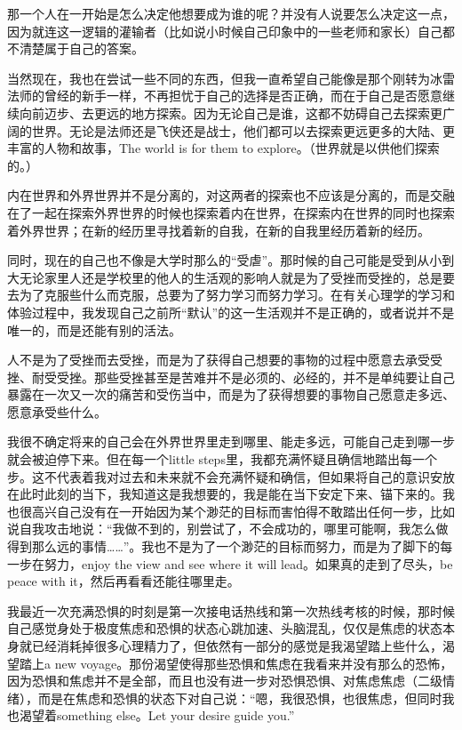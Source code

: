 那一个人在一开始是怎么决定他想要成为谁的呢？并没有人说要怎么决定这一点，因为就连这一逻辑的灌输者（比如说小时候自己印象中的一些老师和家长）自己都不清楚属于自己的答案。

当然现在，我也在尝试一些不同的东西，但我一直希望自己能像是那个刚转为冰雷法师的曾经的新手一样，不再担忧于自己的选择是否正确，而在于自己是否愿意继续向前迈步、去更远的地方探索。因为无论自己是谁，这都不妨碍自己去探索更广阔的世界。无论是法师还是飞侠还是战士，他们都可以去探索更远更多的大陆、更丰富的人物和故事，The world is for them to explore。（世界就是以供他们探索的。）

内在世界和外界世界并不是分离的，对这两者的探索也不应该是分离的，而是交融在了一起\pozhehao{}在探索外界世界的时候也探索着内在世界，在探索内在世界的同时也探索着外界世界；在新的经历里寻找着新的自我，在新的自我里经历着新的经历。

同时，现在的自己也不像是大学时那么的“受虐”。那时候的自己可能是受到从小到大无论家里人还是学校里的他人的生活观的影响\pozhehao{}人就是为了受挫而受挫的，总是要去为了克服些什么而克服，总要为了努力学习而努力学习。在有关心理学的学习和体验过程中，我发现自己之前所“默认”的这一生活观并不是正确的，或者说并不是唯一的，而是还能有别的活法。

人不是为了受挫而去受挫，而是为了获得自己想要的事物的过程中愿意去承受受挫、耐受受挫。那些受挫甚至是苦难并不是必须的、必经的，并不是单纯要让自己暴露在一次又一次的痛苦和受伤当中，而是为了获得想要的事物自己愿意走多远、愿意承受些什么。

我很不确定将来的自己会在外界世界里走到哪里、能走多远，可能自己走到哪一步就会被迫停下来。但在每一个little steps里，我都充满怀疑且确信地踏出每一个步。这不代表着我对过去和未来就不会充满怀疑和确信，但如果将自己的意识安放在此时此刻的当下，我知道这是我想要的，我是能在当下安定下来、锚下来的。我也很高兴自己没有在一开始因为某个渺茫的目标而害怕得不敢踏出任何一步，比如说自我攻击地说：“我做不到的，别尝试了，不会成功的，哪里可能啊，我怎么做得到那么远的事情……”。我也不是为了一个渺茫的目标而努力，而是为了脚下的每一步在努力，enjoy the view and see where it will lead。如果真的走到了尽头，be peace with it，然后再看看还能往哪里走。

我最近一次充满恐惧的时刻是第一次接电话热线和第一次热线考核的时候，那时候自己感觉身处于极度焦虑和恐惧的状态\pozhehao{}心跳加速、头脑混乱，仅仅是焦虑的状态本身就已经消耗掉很多心理精力了，但依然有一部分的感觉是\pozhehao{}我渴望踏上些什么，渴望踏上a new voyage。那份渴望使得那些恐惧和焦虑在我看来并没有那么的恐怖，因为恐惧和焦虑并不是全部，而且也没有进一步对恐惧恐惧、对焦虑焦虑（二级情绪），而是在焦虑和恐惧的状态下对自己说：“嗯，我很恐惧，也很焦虑，但同时我也渴望着something else。Let your desire guide you.”

